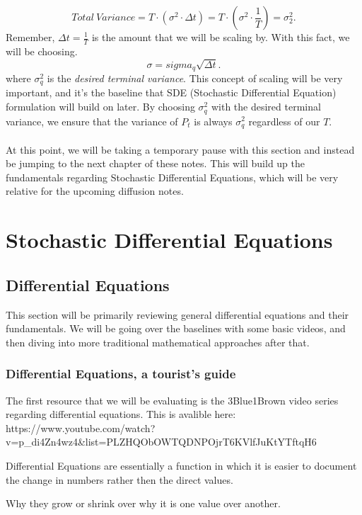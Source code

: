 \documentclass[10pt, oneside]{report}
\begin{document}
\[
Total\ Variance = T \cdot (\sigma^2 \cdot \Delta t) = T \cdot (\sigma^2 \cdot \frac{1}{T}) = \sigma^2_2
.\] 
Remember, $\Delta t =  \frac{1}{T}$ is the amount that we will be scaling by.  With this fact, we will be choosing. \[
    \sigma = sigma_q\sqrt{\Delta t}
.\] where $\sigma^2_q$ is the \textit{desired terminal variance}.  This concept of  scaling will be very important, and it's the baseline that SDE (Stochastic Differential Equation) formulation will build on later. By choosing $\sigma^2_q$ with the desired terminal variance, we ensure that the variance of $P_t$ is always $\sigma^2_q$ regardless of our $T$.
\\
\\
At this point, we will be taking a temporary pause with this section and instead be jumping to the next chapter of these notes.  This will build up the fundamentals regarding Stochastic Differential Equations, which will be very relative for the upcoming diffusion notes. 


\chapter{Stochastic Differential Equations}
\section{Differential Equations}
This section will be primarily reviewing general differential equations and their fundamentals.  We will be going over the baselines with some basic videos, and then diving into more traditional mathematical approaches after that.  
\subsection{Differential Equations, a tourist's guide}
The first resource that we will be evaluating is the 3Blue1Brown video series regarding differential equations. This is avalible here: https://www.youtube.com/watch?v=p_di4Zn4wz4&list=PLZHQObOWTQDNPOjrT6KVlfJuKtYTftqH6

Differential Equations are essentially a function in which it is easier to document the change in numbers rather then the direct values.  

Why they grow or shrink over why it is one value over another.
\end{document}
